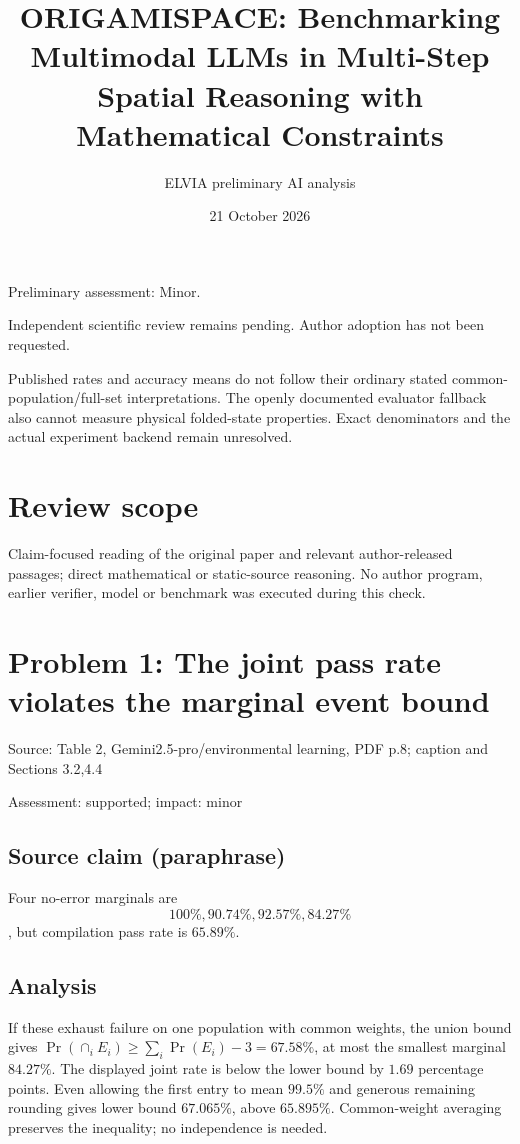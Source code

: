 \documentclass[11pt]{article}
\begin{document}
\title{ORIGAMISPACE: Benchmarking Multimodal LLMs in Multi-Step Spatial Reasoning with Mathematical Constraints}

\author{ELVIA preliminary AI analysis}\date{21 October 2026}\maketitle

Preliminary assessment: Minor.\par

Independent scientific review remains pending. Author adoption has not been requested.

Published rates and accuracy means do not follow their ordinary stated common-population/full-set interpretations. The openly documented evaluator fallback also cannot measure physical folded-state properties. Exact denominators and the actual experiment backend remain unresolved.

\section*{Review scope}

Claim-focused reading of the original paper and relevant author-released passages; direct mathematical or static-source reasoning. No author program, earlier verifier, model or benchmark was executed during this check.

\section*{Problem 1: The joint pass rate violates the marginal event bound}

Source: Table 2, Gemini2.5-pro/environmental learning, PDF p.8; caption and Sections 3.2,4.4

Assessment: supported; impact: minor

\subsection*{Source claim (paraphrase)}

Four no-error marginals are \[100\%,90.74\%,92.57\%,84.27\%\], but compilation pass rate is \(65.89\%\).

\subsection*{Analysis}

If these exhaust failure on one population with common weights, the union bound gives \(\Pr(\cap_i E_i)\ge\sum_i\Pr(E_i)-3=67.58\%\), at most the smallest marginal \(84.27\%\). The displayed joint rate is below the lower bound by \(1.69\) percentage points. Even allowing the first entry to mean \(99.5\%\) and generous remaining rounding gives lower bound \(67.065\%\), above \(65.895\%\). Common-weight averaging preserves the inequality; no independence is needed.
\end{document}
